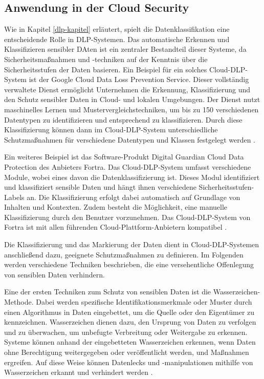 \subsection{Anwendung in der Cloud Security}
Wie in Kapitel \ref{dlp-kapitel} erläutert, spielt die Datenklassifikation eine entscheidende Rolle in DLP-Systemen. Das automatische Erkennen und Klassifizieren sensibler DAten ist ein zentraler Bestandteil dieser Systeme, da Sicherheitsmaßnahmen und -techniken auf der Kenntnis über die Sicherheitsstufen der Daten basieren.
Ein Beispiel für ein solches Cloud-DLP-System ist der Google Cloud Data Loss Prevention Service. Dieser vollständig verwaltete Dienst ermöglicht Unternehmen die Erkennung, Klassifizierung und den Schutz sensibler Daten in Cloud- und lokalen Umgebungen. Der Dienst nutzt maschinelles Lernen und Mustervergleichstechniken, um bis zu 150 verschiedenen Datentypen zu identifizieren und entsprechend zu klassifizieren. Durch diese Klassifizierung können dann im Cloud-DLP-System unterschiedliche Schutzmaßnahmen für verschiedene Datentypen und Klassen festgelegt werden \cite{GoogleCloud.30.11.2023}.

Ein weiteres Beispiel ist das Software-Produkt Digital Guardian Cloud Data Protection des Anbieters Fortra. Das Cloud-DLP-System umfasst verschiedene Module, wobei eines davon die Datenklassifizierung ist. Dieses Modul identifiziert und klassifiziert sensible Daten und hängt ihnen verschiedene Sicherheitsstufen-Labels an. Die Klassifizierung erfolgt dabei automatisch auf Grundlage von Inhalten und Kontexten. Zudem besteht die Möglichkeit, eine manuelle Klassifizierung durch den Benutzer vorzunehmen. Das Cloud-DLP-System von Fortra ist mit allen führenden Cloud-Plattform-Anbietern kompatibel \cite{DigitalGuardian.30.11.2023}.

Die Klassifizierung und das Markierung der Daten dient in Cloud-DLP-Systemen anschließend dazu, geeignete Schutzmaßnahmen zu definieren. Im Folgenden werden verschiedene Techniken beschrieben, die eine versehentliche Offenlegung von sensiblen Daten verhindern.

Eine der ersten Techniken zum Schutz von sensiblen Daten ist die Wasserzeichen-Methode. Dabei werden spezifische Identifikationsmerkmale oder Muster durch einen Algorithmus in Daten eingebettet, um die Quelle oder den Eigentümer zu kennzeichnen. Wasserzeichen dienen dazu, den Ursprung von Daten zu verfolgen und zu überwachen, um unbefugte Verbreitung oder Weitergabe zu erkennen. Systeme können anhand der eingebetteten Wasserzeichen erkennen, wenn Daten ohne Berechtigung weitergegeben oder veröffentlicht werden, und Maßnahmen ergreifen. Auf diese Weise können Datenlecks und -manipulationen mithilfe von Wasserzeichen erkannt und verhindert werden \cite{Naik.2019}.

